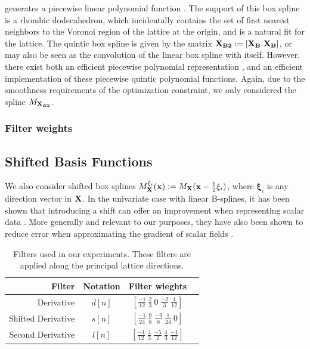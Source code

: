 generates a piecewise linear polynomial function \cite{practicalbox}. The support of this box spline is a rhombic dodecahedron, which incidentally contains the set of first nearest neighbors to the Voronoi region of the lattice at the origin, and is a natural fit for the lattice. The quintic box spline is given by the matrix $\mathbf{\mathbf{X}_{B2}} := \left[\mathbf{\mathbf{X}_{B}} \ \mathbf{\mathbf{X}_{B}}\right]$, or may also be seen as the convolution of the linear box spline with itself.  However, there exist both an efficient piecewise polynomial representation \cite{practicalbox}, and an efficient implementation \cite{fastbox} of these piecewise quintic polynomial functions. Again, due to the smoothness requirements of the optimization constraint, we only considered the spline $M_{\mathbf{X}_{B2}}$.

\subsubsection{Filter weights}


\subsection{Shifted Basis Functions}
We also consider shifted box splines $M_{\mathbf{\mathbf{X}}}^{\xi_i}(\mathbf{x}) := M_{\mathbf{\mathbf{X}}}(\mathbf{x} - \frac{1}{2}\mathbf{\xi}_i)$, where $\mathbf{\xi}_i$ is any direction vector in $\mathbf{\mathbf{X}}$. In the univariate case with linear B-splines, it has been shown that introducing a shift can offer an improvement when representing scalar data \cite{linearrev}. More generally and relevant to our purposes, they have also been shown to reduce error when approximating the gradient of scalar fields \cite{gradrev}.

\begin{table}[!t]
	\renewcommand{\arraystretch}{1.5}
	\centering
	\begin{tabular}{|r||c||c|c|}
		\hline
		Filter & Notation & Filter wieghts  \\
		\hline
		\hline
		Derivative & $d[n]$ & $[\frac{-1}{12} \ \frac{2}{3} \ 0 \ \frac{-2}{3} \ \frac{1}{12}]$ \\
		\hline
		Shifted Derivative & $s[n]$  & $[\frac{-1}{24} \ \frac{9}{8} \ \frac{-9}{8} \ \frac{1}{24} \ 0]$ \\
		\hline
		Second Derivative & $l[n]$  & $[\frac{-1}{12} \ \frac{4}{3} \ \frac{-5}{2} \ \frac{4}{3} \ \frac{-1}{12}]$ \\
		\hline
	\end{tabular}
	\caption{Filters used in our experiments. These filters are applied along the principal lattice directions.}
	\label{tab:filters}
\end{table}


